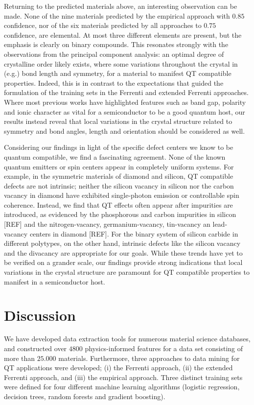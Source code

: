 \documentclass[superscriptaddress,unsortedaddress,
 amsmath,amssymb,
 aps,
]{revtex4-2}
\begin{document}
Returning to the predicted materials above, an interesting observation can be made. None of the nine materials predicted by the empirical approach with $0.85$ confidence, nor of the six materials predicted by all approaches to $0.75$ confidence, are elemental. At most three different elements are present, but the emphasis is clearly on binary compounds. This resonates strongly with the observations from the principal component analysis: an optimal degree of crystalline order likely exists, where some variations throughout the crystal in (e.g.) bond length and symmetry, for a material to manifest QT compatible properties. Indeed, this is in contrast to the expectations that guided the formulation of the training sets in the Ferrenti and extended Ferrenti approaches. Where most previous works have highlighted features such as band gap, polarity and ionic character as vital for a semiconductor to be a good quantum host, our results instead reveal that local variations in the crystal structure related to symmetry and bond angles, length and orientation should be considered as well. 

Considering our findings in light of the specific defect centers we know to be quantum compatible, we find a fascinating agreement. None of the known quantum emitters or spin centers appear in completely uniform systems. For example, in the symmetric materials of diamond and silicon, QT compatible defects are not intrinsic; neither the silicon vacancy in silicon nor the carbon vacancy in diamond have exhibited single-photon emission or controllable spin coherence. Instead, we find that QT effects often appear after impurities are introduced, as evidenced by the phosphorous and carbon impurities in silicon [REF] and the nitrogen-vacancy, germanium-vacancy, tin-vacancy an lead-vacancy centers in diamond [REF]. 
For the binary system of silicon carbide in different polytypes, on the other hand, intrinsic defects like the silicon vacancy and the divacancy are appropriate for our goals. 
While these trends have yet to be verified on a grander scale, our findings provide strong indications that local variations in the crystal structure are paramount for QT  compatible properties to manifest in a semiconductor host. 



\section*{Discussion} 
We have developed data extraction tools for numerous material science databases, and constructed over $4800$ physics-informed features for a data set consisting of more than $25.000$ materials. Furthermore, three approaches to data mining for QT applications were developed; (i) the Ferrenti approach, (ii) the extended Ferrenti approach, and (iii) the empirical approach.  
Three distinct training sets were defined for four different machine learning algorithms (logistic regression, decision trees, random forests and gradient boosting).  
\end{document}

